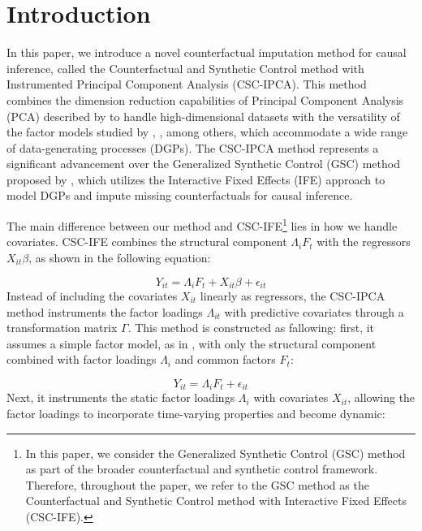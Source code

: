 \documentclass[12pt]{article}
\begin{document}
\section{Introduction} 
\label{sec: introduction}
In this paper, we introduce a novel counterfactual imputation method for causal inference, called the Counterfactual and Synthetic Control method with Instrumented Principal Component Analysis (CSC-IPCA). This method combines the dimension reduction capabilities of Principal Component Analysis (PCA) described by \cite{jollife2016principal} to handle high-dimensional datasets with the versatility of the factor models studied by \cite{bai2003computation}, \cite{bai2009panel}, among others, which accommodate a wide range of data-generating processes (DGPs). The CSC-IPCA method represents a significant advancement over the Generalized Synthetic Control (GSC) method proposed by \cite{xu2017generalized}, which utilizes the Interactive Fixed Effects (IFE) approach to model DGPs and impute missing counterfactuals for causal inference.

The main difference between our method and CSC-IFE\footnote{In this paper, we consider the Generalized Synthetic Control (GSC) method as part of the broader counterfactual and synthetic control framework. Therefore, throughout the paper, we refer to the GSC method as the Counterfactual and Synthetic Control method with Interactive Fixed Effects (CSC-IFE).} lies in how we handle covariates. CSC-IFE combines the structural component $\Lambda_i F_t$ with the regressors $X_{it} \beta$, as shown in the following equation:

\begin{equation}
\label{eqn: ife}
Y_{it} = \Lambda_i F_t + X_{it} \beta + \epsilon_{it}
\end{equation}
Instead of including the covariates $X_{it}$ linearly as regressors, the CSC-IPCA method instruments the factor loadings $\Lambda_{it}$ with predictive covariates through a transformation matrix $\Gamma$. This method is constructed as fallowing: first, it assumes a simple factor model, as in \cite{bai2003computation}, with only the structural component combined with factor loadings $\Lambda_i$ and common factors $F_t$:

\begin{equation}
\label{eqn: fe}
Y_{it} = \Lambda_i F_t + \epsilon_{it}
\end{equation}
Next, it instruments the static factor loadings $\Lambda_i$ with covariates $X_{it}$, allowing the factor loadings to incorporate time-varying properties and become dynamic:
\end{document}
